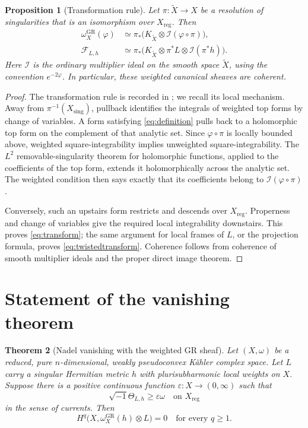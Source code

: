 \documentclass[11pt,a4paper,reqno]{amsart}
\newtheorem{theorem}{Theorem}[section]
\newtheorem{proposition}[theorem]{Proposition}
\theoremstyle{definition}
\theoremstyle{remark}
\numberwithin{equation}{section}
\newcommand{\II}{\mathcal I}
\newcommand{\FF}{\mathcal F}
\newcommand{\reg}{\mathrm{reg}}
\newcommand{\sing}{\mathrm{sing}}
\newcommand{\GR}{\mathrm{GR}}
\newcommand{\ii}{\sqrt{-1}}
\newcommand{\wGR}{\omega_X^{\GR}}
\begin{document}
\begin{proposition}[Transformation rule]\label{prop:transform}
Let $\pi:\widetilde X\to X$ be a resolution of singularities that is an
isomorphism over $X_{\reg}$. Then
\begin{align}
 \wGR(\varphi)
 &\simeq \pi_*\bigl(K_{\widetilde X}\otimes\II(\varphi\circ\pi)\bigr),
 \label{eq:transform}\\
 \FF_{L,h}
 &\simeq \pi_*\bigl(K_{\widetilde X}\otimes\pi^*L
                    \otimes\II(\pi^*h)\bigr).
 \label{eq:twistedtransform}
\end{align}
Here $\II$ is the ordinary multiplier ideal on the smooth space
$\widetilde X$, using the convention $e^{-2\varphi}$. In particular,
these weighted canonical sheaves are coherent.
\end{proposition}

\begin{proof}
The transformation rule is recorded in \cite[Remark~2.2]{Li}; we recall
its local mechanism. Away from $\pi^{-1}(X_{\sing})$, pullback identifies
the integrals of weighted top forms by change of variables. A form
satisfying \eqref{eq:definition} pulls back to a holomorphic top form on
the complement of that analytic set. Since $\varphi\circ\pi$ is locally
bounded above, weighted square-integrability implies unweighted
square-integrability. The $L^2$ removable-singularity theorem for
holomorphic functions, applied to the coefficients of the top form,
extends it holomorphically across the analytic set. The weighted
condition then says exactly that its coefficients belong to
$\II(\varphi\circ\pi)$.

Conversely, such an upstairs form restricts and descends over
$X_{\reg}$. Properness and change of variables give the required local
integrability downstairs. This proves \eqref{eq:transform}; the same
argument for local frames of $L$, or the projection formula, proves
\eqref{eq:twistedtransform}. Coherence follows from coherence of smooth
multiplier ideals and the proper direct image theorem.
\end{proof}

\section{Statement of the vanishing theorem}

\begin{theorem}[Nadel vanishing with the weighted GR sheaf]
\label{thm:main}
Let $(X,\omega)$ be a reduced, pure $n$-dimensional, weakly pseudoconvex
K\"ahler complex space. Let $L$ carry a singular Hermitian metric $h$ with
plurisubharmonic local weights on $X$. Suppose there is a positive
continuous function $\varepsilon:X\to(0,\infty)$ such that
\begin{equation}\label{eq:curvature}
 \ii\Theta_{L,h}\geq\varepsilon\omega
 \quad\text{on }X_{\reg}
\end{equation}
in the sense of currents. Then
\begin{equation}\label{eq:vanishing}
 \boxed{\ H^q\bigl(X,\wGR(h)\otimes L\bigr)=0
                 \quad\text{for every }q\geq1.\ }
\end{equation}
\end{theorem}
\end{document}
